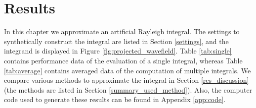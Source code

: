 \chapter{Results}
\label{chap5}
\setlength{\tabcolsep}{5pt}
In this chapter we approximate an artificial Rayleigh integral.
The settings to synthetically construct the integral are listed in Section \ref{settings}, and the integrand is displayed in Figure \ref{fig:projected_wavefield}.
Table \ref{tab:single} contains performance data of the evaluation of a single integral, whereas Table \ref{tab:average} contains averaged data of the computation of multiple integrals.
We compare various methods to approximate the integral in Section \ref{res_discussion} (the methods are listed in Section \ref{summary_used_method}).
Also, the computer code used to generate these results can be found in Appendix \ref{app:code}.

